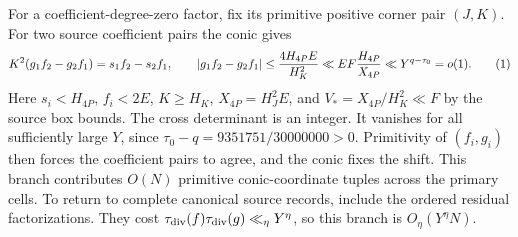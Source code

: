 For a coefficient-degree-zero factor, fix its primitive positive corner
pair $(J,K)$.  For two source coefficient pairs the conic gives
\[
 K^2(g_1f_2-g_2f_1)=s_1f_2-s_2f_1,
 \qquad |g_1f_2-g_2f_1|
 \le \frac{4H_{4P}E}{H_K^2}
 \ll EF\frac{H_{4P}}{X_{4P}}
 \ll Y^{q-\tau_0}=o(1).
\AutoTag{eq:old:6_18}
\]
Here $s_i<H_{4P}$, $f_i<2E$, $K\ge H_K$, $X_{4P}=H_J^2E$, and
 $V_*=X_{4P}/H_K^2\ll F$ by the source box bounds.  The cross determinant
is an integer.  It vanishes for all sufficiently large $Y$, since
$\tau_0-q=9351751/30000000>0$.  Primitivity of $(f_i,g_i)$ then forces
the coefficient pairs to agree, and the conic fixes the shift.  This
branch contributes \(O(N)\) primitive conic-coordinate tuples across the
primary cells.  To return to complete canonical source records, include
the ordered residual factorizations.  They cost
\(\tau_{\mathrm{div}}(f)\tau_{\mathrm{div}}(g)\ll_\eta Y^\eta\), so this branch is
\(O_\eta(Y^\eta N)\).

